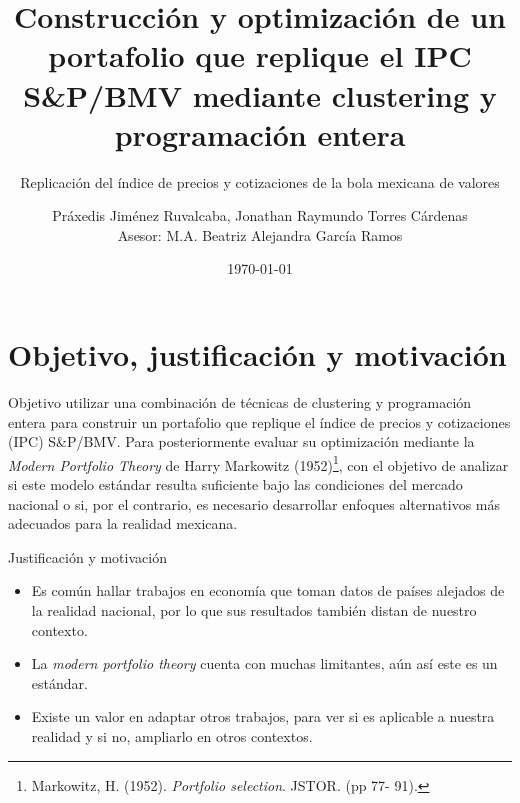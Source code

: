\documentclass[aspectratio=169,xcolor=dvipsnames]{beamer}
\title{Construcción y optimización de un portafolio que replique el IPC S\&P/BMV mediante clustering y programación entera}
\subtitle{Replicación del índice de precios y cotizaciones de la bola mexicana de valores}
\author{Práxedis Jiménez Ruvalcaba, Jonathan Raymundo Torres Cárdenas \\ Asesor: M.A. Beatriz Alejandra García Ramos \\ }
\institute
{
    Facultad de Ciencias Físico Matemáticas \\
    Universidad Áutónoma de Nuevo León
}
\date{\today}
\begin{document}
\begin{frame}[c]

    \vspace{1cm}
    \begin{center}
        \insertauthor\par
        \vspace{0.5cm}
        \insertinstitute\par
        \insertdate
    \end{center}
    
\end{frame}

\section{Objetivo, justificación y motivación}
\begin{frame}{Objetivo}
    \quad utilizar una combinación de técnicas de clustering y programación entera para construir un portafolio que 
    replique el índice de precios y cotizaciones (IPC) S\&P/BMV. Para posteriormente evaluar su optimización mediante
    la \textit{Modern Portfolio Theory} de Harry Markowitz (1952)\footnote{Markowitz, H. (1952). \emph{Portfolio selection}.
    JSTOR. (pp 77- 91).}, con el objetivo de analizar si este modelo estándar resulta suficiente bajo las condiciones del
    mercado nacional o si, por el contrario, es necesario desarrollar enfoques alternativos más adecuados para la realidad mexicana. 
\end{frame}

\begin{frame}{Justificación y motivación}
    \begin{itemize}
        \item Es común hallar trabajos en economía que toman datos de países alejados de la realidad nacional,
        por lo que sus resultados también distan de nuestro contexto.
        \item La \textit{modern portfolio theory} cuenta con muchas limitantes, aún así este es un estándar.
        \item Existe un valor en adaptar otros trabajos, para ver si es aplicable a nuestra realidad y si no, ampliarlo en otros contextos.
    \end{itemize}
\end{frame}
\end{document}
